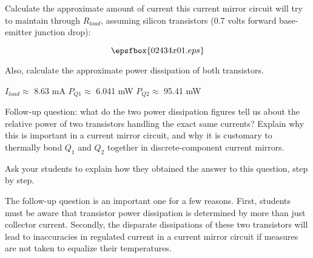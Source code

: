

Calculate the approximate amount of current this current mirror circuit will try to maintain through $R_{load}$, assuming silicon transistors (0.7 volts forward base-emitter junction drop):

$$\epsfbox{02434x01.eps}$$

Also, calculate the approximate power dissipation of both transistors.







$I_{load} \approx$ 8.63 mA \hskip 30pt $P_{Q1} \approx$ 6.041 mW \hskip 30pt $P_{Q2} \approx $ 95.41 mW

\vskip 10pt

Follow-up question: what do the two power dissipation figures tell us about the relative power of two transistors handling the exact same currents?  Explain why this is important in a current mirror circuit, and why it is customary to thermally bond $Q_1$ and $Q_2$ together in discrete-component current mirrors.







Ask your students to explain how they obtained the answer to this question, step by step.

The follow-up question is an important one for a few reasons.  First, students must be aware that transistor power dissipation is determined by more than just collector current.  Secondly, the disparate dissipations of these two transistors will lead to inaccuracies in regulated current in a current mirror circuit if measures are not taken to equalize their temperatures.




